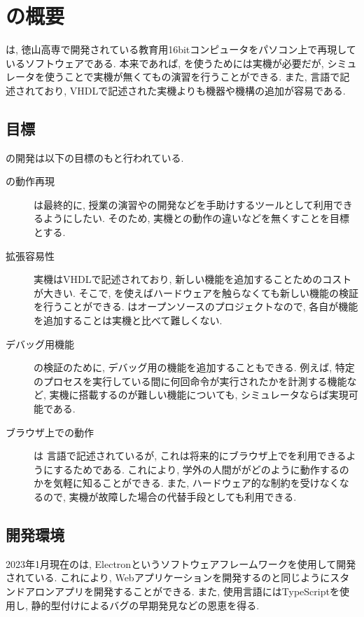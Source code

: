 \chapter{\tacsim の概要}

\tacsim は, 徳山高専で開発されている教育用16bitコンピュータ\tac をパソコン上で再現しているソフトウェアである. 本来であれば, \tac を使うためには実機が必要だが, シミュレータを使うことで実機が無くても\tac の演習を行うことができる. また, \ts 言語で記述されており, VHDLで記述された実機よりも機器や機構の追加が容易である.

\section{目標}

\tacsim の開発は以下の目標のもと行われている.

\begin{description}
    \item[ \tac の動作再現 ] \tacsim は最終的に, 授業の演習や\tacos の開発などを手助けするツールとして利用できるようにしたい. そのため, 実機との動作の違いなどを無くすことを目標とする.
    \item[ 拡張容易性 ] \tac 実機はVHDLで記述されており, 新しい機能を追加することためのコストが大きい. そこで, \tacsim を使えばハードウェアを触らなくても新しい機能の検証を行うことができる. \tacsim はオープンソースのプロジェクトなので, 各自が機能を追加することは\tac 実機と比べて難しくない.
    \item[ デバッグ用機能 ] \tac の検証のために, デバッグ用の機能を追加することもできる. 例えば, 特定のプロセスを実行している間に何回命令が実行されたかを計測する機能など, 実機に搭載するのが難しい機能についても, シミュレータならば実現可能である. 
    \item[ ブラウザ上での動作 ] \tacsim は \ts 言語で記述されているが, これは将来的にブラウザ上で\tac を利用できるようにするためである. これにより, 学外の人間が\tac がどのように動作するのかを気軽に知ることができる. また, ハードウェア的な制約を受けなくなるので, 実機が故障した場合の代替手段としても利用できる.
\end{description}

\section{開発環境}

2023年1月現在の\tacsim は, Electronというソフトウェアフレームワークを使用して開発されている. これにより, Webアプリケーションを開発するのと同じようにスタンドアロンアプリを開発することができる. また, 使用言語にはTypeScriptを使用し, 静的型付けによるバグの早期発見などの恩恵を得る.


